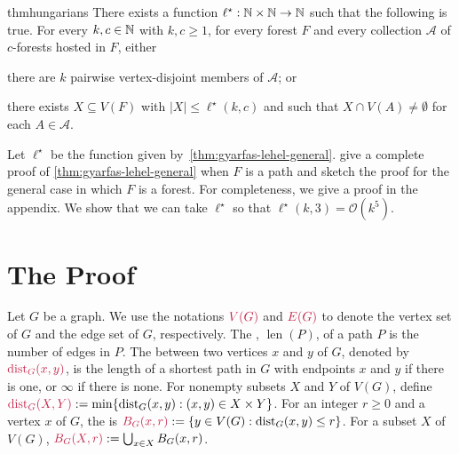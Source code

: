 \documentclass{patmorin}
\newcommand{\pat}[1]{\textcolor{Blue}{[Pat: #1]}}
\newcommand{\gwen}[1]{\textcolor{Purple}{Gwen: #1}}
\newcommand{\piotr}[1]{\textcolor{red}{Piotr: #1}}
\DeclareMathOperator{\len}{len}
\DeclareMathOperator{\dist}{dist}
\newcommand{\Oh}{\mathcal{O}}
\begin{document}
\begin{restatable}
{thm}{hungarians}\label{thm:gyarfas-lehel-general}
   There exists a function $\ell^\star:\mathbb{N}\times\mathbb{N}\to\mathbb{N}$ such that the following is true. For every $k,c\in\mathbb{N}$ with $k,c\geq1$, for every forest $F$ and 
    every collection $\mathcal{A}$ of $c$-forests hosted in $F$, either
   \begin{tightenum}%
     \item there are $k$ pairwise vertex-disjoint members of $\mathcal{A}$; or
     \item there exists $X \subseteq V(F)$ with 
     $|X|\leq \ell^\star(k,c)$ and such that 
     $X\cap V(A)\neq\emptyset$ for each $A\in\mathcal{A}$. 
   \end{tightenum}
\end{restatable}
Let $\ell^\star$ be the function given by~\cref{thm:gyarfas-lehel-general}. \citet{gyarfas.lehel:helly} give a complete proof of \cref{thm:gyarfas-lehel-general} when $F$ is a path and sketch the proof for the general case in which $F$ is a forest.
For completeness, we give a proof in the appendix. 
We show that we can take $\ell^\star$ so that $\ell^\star(k,3)=\Oh(k^5)$.




\section{The Proof}
\label{proof}

Let $G$ be a graph.  We use the notations $\mathdefin{V(G)}$ and $\mathdefin{E(G)}$ to denote the vertex set of $G$ and the edge set of $G$, respectively.
The , $\len(P)$, of a path $P$
is the number of edges in $P$. 
The  between two vertices $x$ and $y$ of $G$, 
denoted by $\mathdefin{\dist_G(x,y)}$, 
is the length of a shortest path in $G$ with endpoints $x$ and $y$ if there is one, or $\infty$ if there is none.  
For nonempty subsets $X$ and $Y$ of $V(G)$, 
define $\mathdefin{\dist_G(X,Y)}:=\min\{\dist_G(x,y):(x,y)\in X\times Y\}$. 
For an integer $r\ge 0$ and a vertex $x$ of $G$, 
the  is $\mathdefin{B_G(x,r)}:=\{y\in V(G):\dist_G(x,y)\le r\}$.  For a subset $X$ of $V(G)$, $\mathdefin{B_G(X,r)}:=\bigcup_{x\in X}B_G(x,r)$.
\end{document}
